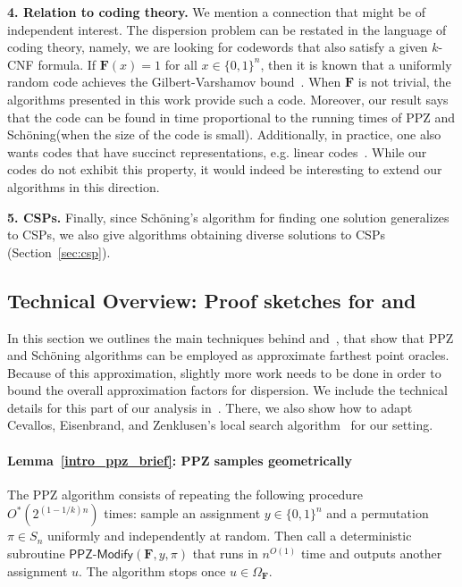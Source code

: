 \documentclass[11pt, letterpaper]{article}
\theoremstyle{definition}
\newcommand{\f}{\mathbf{F}}
\newcommand{\Om}{\Omega_{\f}}
\newcommand{\PPZMod}{\textsf{PPZ-Modify}}
\newcommand{\sch}{Sch\"{o}ning\xspace}
\newcommand{\Sch}{Sch\"{o}ning\xspace}
\begin{document}
\medskip\noindent
\textbf{4. Relation to coding theory.} We mention a connection that might be of independent interest. The dispersion problem can be restated in the language of coding theory, namely, we are looking for codewords that also satisfy a given $k$-CNF formula. If $\f(x) = 1$ for all $x \in \{0,1\}^n$, then it is known that a uniformly random code achieves the Gilbert-Varshamov bound~\cite{Roth_2006}. When $\f$ is not trivial, the algorithms presented in this work provide such a code. Moreover, our result says that the code can be found in time proportional to the running times of PPZ and \Sch (when the size of the code is small).  Additionally, in practice, one also wants codes that have succinct representations, e.g. linear codes~\cite{guruswami2010list,grigorescu2012succinct}. While our codes do not exhibit this property, it would indeed be interesting to extend our algorithms in this direction.

\medskip\noindent
\textbf{5. CSPs.} Finally, since \sch's algorithm for finding one solution generalizes to CSPs, we also give algorithms obtaining diverse solutions to CSPs (Section~\ref{sec:csp}). 




\subsection{Technical Overview: Proof sketches for  and } \label{sec:techniques}

In this section we outlines the main techniques behind  and~, that show that PPZ and Sch\"{o}ning algorithms can be employed as approximate farthest point oracles. Because of this approximation, slightly more work needs to be done in order to bound the overall approximation factors for dispersion. We include the technical details for this part of our analysis in~. There, we also show how to adapt Cevallos, Eisenbrand, and Zenklusen's local search algorithm~\cite{cevallos2019improved} for our setting.

\paragraph{Lemma~\ref{intro_ppz_brief}: PPZ samples geometrically} The PPZ algorithm consists of repeating the following procedure $O^*(2^{(1-1/k)n})$ times: sample an assignment $y \in \{0,1\}^n $ and a permutation $\pi \in S_n$ uniformly and independently at random. Then call a deterministic subroutine $\PPZMod(\f,y,\pi)$ that runs in $n^{O(1)}$ time and outputs another assignment $u$. The algorithm stops once $u \in \Om$.
\end{document}

